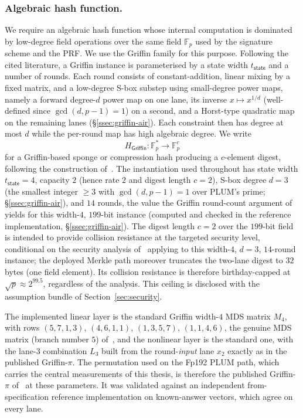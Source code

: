 \subsubsection{Algebraic hash function.}
We require an algebraic hash function whose internal computation is dominated by low-degree field operations over the same field $\mathbb{F}_p$ used by the signature scheme and the PRF. We use the Griffin family for this purpose. Following the cited literature, a Griffin instance is parameterised by a state width $t_{\mathsf{state}}$ and a number of rounds. Each round consists of constant-addition, linear mixing by a fixed matrix, and a low-degree S-box substep using small-degree power maps, namely a forward degree-$d$ power map on one lane, its inverse $x\mapsto x^{1/d}$ (well-defined since $\gcd(d,p-1)=1$) on a second, and a Horst-type quadratic map on the remaining lanes (\S\ref{ssec:griffin-air}). Each constraint then has degree at most $d$ while the per-round map has high algebraic degree. We write
\begin{equation*}
  H_{\mathsf{Griffin}}:\mathbb{F}_p^{\ast}\to\mathbb{F}_p^{c}
\end{equation*}
for a Griffin-based sponge or compression hash producing a $c$-element digest, following the construction of~\cite{cryptoeprint:2022/403}. The instantiation used throughout has state width $t_{\mathsf{state}}=4$, capacity $2$ (hence rate $2$ and digest length $c=2$), S-box degree $d=3$ (the smallest integer $\ge 3$ with $\gcd(d,p-1)=1$ over PLUM's prime; \S\ref{ssec:griffin-air}), and $14$ rounds, the value the Griffin round-count argument of~\cite{cryptoeprint:2022/403} yields for this width-$4$, $199$-bit instance (computed and checked in the reference implementation, \S\ref{ssec:griffin-air}). The digest length $c=2$ over the $199$-bit field is intended to provide collision resistance at the targeted security level, conditional on the security analysis of~\cite{cryptoeprint:2022/403} applying to this width-$4$, $d=3$, $14$-round instance; the deployed Merkle path moreover truncates the two-lane digest to $32$ bytes (one field element). Its collision resistance is therefore birthday-capped at $\sqrt p\approx2^{99.5}$, regardless of the analysis. This ceiling is disclosed with the assumption bundle of Section~\ref{sec:security}.

The implemented linear layer is the standard Griffin width-$4$ MDS matrix $M_4$, with rows $(5,7,1,3)$, $(4,6,1,1)$, $(1,3,5,7)$, $(1,1,4,6)$, the genuine MDS matrix (branch number $5$) of~\cite{cryptoeprint:2022/403}, and the nonlinear layer is the standard one, with the lane-$3$ combination $L_3$ built from the round-\emph{input} lane $x_2$ exactly as in the published Griffin-$\pi$. The permutation used on the Fp192 PLUM path, which carries the central measurements of this thesis, is therefore the published Griffin-$\pi$ of~\cite{cryptoeprint:2022/403} at these parameters. It was validated against an independent from-specification reference implementation on known-answer vectors, which agree on every lane.

